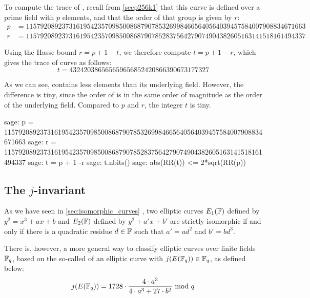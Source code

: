 \begin{example}\label{ex:secp256k1-trace}To compute the trace of , recall from \examplename{} \ref{secp256k1} that this curve is defined over a prime field with $p$ elements, and that the order of that group is given by $r$:  
\begin{align*}
p &= \scriptstyle 115792089237316195423570985008687907853269984665640564039457584007908834671663\\
r &= \scriptstyle 115792089237316195423570985008687907852837564279074904382605163141518161494337
\end{align*}

Using the Hasse bound $r = p + 1 -t$, we therefore compute $t= p+1 -r$, which gives the trace of curve  as follows:
$$
t = \scriptstyle 432420386565659656852420866390673177327
$$

As we can see,  contains less elements than its underlying field. However,  the difference is tiny, since the order of  is in the same order of magnitude as the order of the underlying field. Compared to $p$ and $r$, the integer $t$ is tiny.

\begin{sagecommandline}
sage: p = 115792089237316195423570985008687907853269984665640564039457584007908834671663
sage: r = 115792089237316195423570985008687907852837564279074904382605163141518161494337
sage: t = p + 1 -r
sage: t.nbits()
sage: abs(RR(t)) <= 2*sqrt(RR(p))
\end{sagecommandline}
\end{example} 

\subsection{The $j$-invariant}
\label{sec:j-inv} As we have seen in \ref{sec:isomorphic_curves} , two elliptic curves $E_1(\mathbb{F})$ defined by $y^2 = x^3 + ax +b$ and $E_2(\mathbb{F})$ defined by $y^2 + a'x + b'$ are strictly isomorphic if and only if there is a quadratic residue $d\in \mathbb{F}$ such that $a' = a d^2$ and $b' = b d^3$. 

There is, however, a more general way to classify elliptic curves over finite fields $\mathbb{F}_q$, based on the so-called  of an elliptic curve with $j(E(\mathbb{F}_q))\in\mathbb{F}_q$, as defined below:
\begin{equation}\label{eq:j-invariant1}
j(E(\mathbb{F}_q)) = 1728\cdot \frac{4\cdot a^3}{4\cdot a^3+ 27\cdot b^2} \text{ mod } q
\end{equation}

